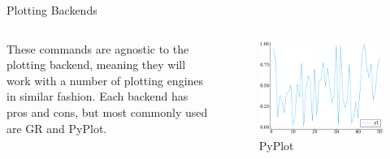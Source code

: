 \documentclass{beamer}
\begin{document}
\begin{frame}[fragile]{Plotting Backends}
	\begin{columns}
	These commands are agnostic to the plotting backend, meaning they will work with a number of plotting engines in similar fashion. Each backend has pros and cons, but most commonly used are GR and PyPlot.
	
	\begin{figure}[h]
		\centering
		\includegraphics[width=.8\textwidth]{randPlotPy}
		\caption{PyPlot}
	\end{figure}


\end{columns}
\end{frame}
\end{document}
